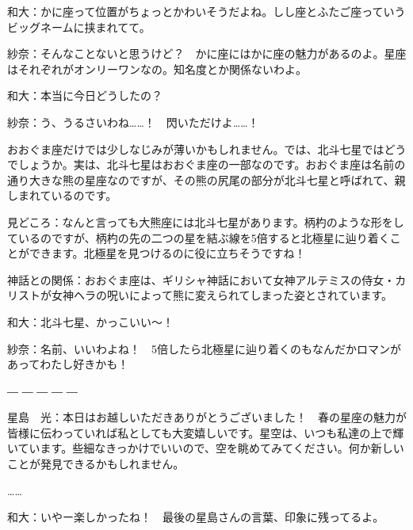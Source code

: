 \documentclass[../../super_nova_2023]{subfiles}
\begin{document}
\phantom{a}\par
和大：かに座って位置がちょっとかわいそうだよね。しし座とふたご座っていうビッグネームに挟まれてて。


\phantom{a}\par
紗奈：そんなことないと思うけど？　かに座にはかに座の魅力があるのよ。星座はそれぞれがオンリーワンなの。知名度とか関係ないわよ。


\phantom{a}\par
和大：本当に今日どうしたの？


\phantom{a}\par
紗奈：う、うるさいわね……！　閃いただけよ……！


\phantom{a}\par
{}
{}
\begin{tcolorbox}[title=6. おおぐま座]
	おおぐま座だけでは少しなじみが薄いかもしれません。では、北斗七星ではどうでしょうか。実は、北斗七星はおおぐま座の一部なのです。おおぐま座は名前の通り大きな熊の星座なのですが、その熊の尻尾の部分が北斗七星と呼ばれて、親しまれているのです。
	
	
	\phantom{a}\par
	見どころ：なんと言っても大熊座には北斗七星があります。柄杓のような形をしているのですが、柄杓の先の二つの星を結ぶ線を5倍すると北極星に辿り着くことができます。北極星を見つけるのに役に立ちそうですね！
	
	
	\phantom{a}\par
	神話との関係：おおぐま座は、ギリシャ神話において女神アルテミスの侍女・カリストが女神ヘラの呪いによって熊に変えられてしまった姿とされています。  
\end{tcolorbox}

\phantom{a}\par
和大：北斗七星、かっこいい〜！


\phantom{a}\par
紗奈：名前、いいわよね！　5倍したら北極星に辿り着くのもなんだかロマンがあってわたし好きかも！

― ― ― ― ―


\phantom{a}\par
星島　光：本日はお越しいただきありがとうございました！　春の星座の魅力が皆様に伝わっていれば私としても大変嬉しいです。星空は、いつも私達の上で輝いています。些細なきっかけでいいので、空を眺めてみてください。何か新しいことが発見できるかもしれません。


\phantom{a}\par
……


\phantom{a}\par
和大：いやー楽しかったね！　最後の星島さんの言葉、印象に残ってるよ。
\end{document}
